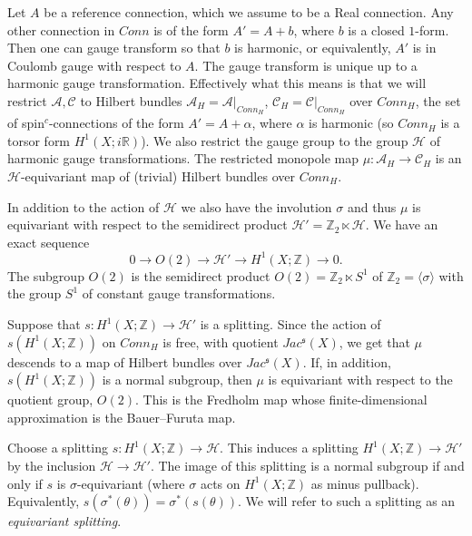 \documentclass{amsart}
\theoremstyle{definition}
\theoremstyle{remark}
\numberwithin{equation}{section}
\begin{document}
Let $A$ be a reference connection, which we assume to be a Real connection. Any other connection in $Conn$ is of the form $A' = A + b$, where $b$ is a closed $1$-form. Then one can gauge transform so that $b$ is harmonic, or equivalently, $A'$ is in Coulomb gauge with respect to $A$. The gauge transform is unique up to a harmonic gauge transformation. Effectively what this means is that we will restrict $\mathcal{A}, \mathcal{C}$ to Hilbert bundles $\mathcal{A}_H = \mathcal{A}|_{Conn_H}$, $\mathcal{C}_H = \mathcal{C}|_{Conn_H}$ over $Conn_H$, the set of spin$^c$-connections of the form $A' = A + \alpha$, where $\alpha$ is harmonic (so $Conn_H$ is a torsor form $H^1(X ; i\mathbb{R})$). We also restrict the gauge group to the group $\mathcal{H}$ of harmonic gauge transformations. The restricted monopole map $\mu : \mathcal{A}_H \to \mathcal{C}_H$ is an $\mathcal{H}$-equivariant map of (trivial) Hilbert bundles over $Conn_H$.

In addition to the action of $\mathcal{H}$ we also have the involution $\sigma$ and thus $\mu$ is equivariant with respect to the semidirect product $\mathcal{H}' = \mathbb{Z}_2 \ltimes \mathcal{H}$. We have an exact sequence
\[
0 \to O(2) \to \mathcal{H}' \to H^1(X ; \mathbb{Z}) \to 0.
\]
The subgroup $O(2)$ is the semidirect product $O(2) = \mathbb{Z}_2 \ltimes S^1$ of $\mathbb{Z}_2 = \langle \sigma \rangle$ with the group $S^1$ of constant gauge transformations.

Suppose that $s : H^1(X ; \mathbb{Z}) \to \mathcal{H}'$ is a splitting. Since the action of $s(H^1(X ; \mathbb{Z}))$ on $Conn_H$ is free, with quotient $Jac^{\mathfrak{s}}(X)$, we get that $\mu$ descends to a map of Hilbert bundles over $Jac^{\mathfrak{s}}(X)$. If, in addition, $s(H^1(X ; \mathbb{Z}))$ is a normal subgroup, then $\mu$ is equivariant with respect to the quotient group, $O(2)$. This is the Fredholm map whose finite-dimensional approximation is the Bauer--Furuta map.

Choose a splitting $s : H^1(X ; \mathbb{Z}) \to \mathcal{H}$. This induces a splitting $H^1(X ; \mathbb{Z}) \to \mathcal{H}'$ by the inclusion $\mathcal{H} \to \mathcal{H}'$. The image of this splitting is a normal subgroup if and only if $s$ is $\sigma$-equivariant (where $\sigma$ acts on $H^1(X ; \mathbb{Z})$ as minus pullback). Equivalently, $s( \sigma^*(\theta) )  = \sigma^*( s(\theta))$. We will refer to such a splitting as an {\em equivariant splitting}. 
\end{document}
